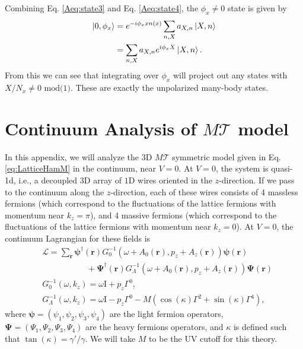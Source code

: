\documentclass[prb,aps,twocolumn,groupaddress,floatfix]{revtex4-1}
\begin{document}
Combining Eq. \ref{Aeq:state3} and Eq. \ref{Aeq:state4}, the $\phi_x \neq 0$ state is given by
\begin{equation}
\begin{split}
\ket{0,\phi_x} &= e^{-i\phi_x x n(x)}\sum_{n,X} a_{X,n} \ket{X,n}\\
& = \sum_{n,X} a_{X,n} e^{i\phi_x X}\ket{X,n}.
\end{split}\label{Aeq:state5}
\end{equation}
From this we can see that integrating over $\phi_x$ will project out any states with $X/N_x \neq 0\text{ mod(1)}$. These are exactly the unpolarized many-body states. 





\section{Continuum Analysis of $M\mathcal{T}$ model} \label{app:MContAnalysis}
In this appendix, we will analyze the $3$D $M\mathcal{T}$ symmetric model given in Eq. \ref{eq:LatticeHamM} in the continuum, near $V = 0$.  At $V = 0$, the system is quasi-1d, i.e., a decoupled $3$D array of $1$D wires oriented in the $z$-direction. If we pass to the continuum along the $z$-direction, each of these wires consists of 4 massless fermions (which correspond to the fluctuations of the lattice fermions with momentum near $k_z = \pi$), and 4 massive fermions (which correspond to the fluctuations of the lattice fermions with momentum near $k_z = 0$). At $V = 0$, the continuum Lagrangian for these fields is 
\begin{equation}
\begin{split}
&\mathcal{L} = \sum_{\bm{r}} \bm{\psi}^\dagger(\bm{r})G^{-1}_0(\omega+A_0(\bm{r}),p_z+A_z(\bm{r}))\bm{\psi}(\bm{r})\\ &\phantom{====} +\bm{\Psi}^\dagger(\bm{r})G^{-1}_\Lambda(\omega+A_0(\bm{r}),p_z+A_z(\bm{r}))\bm{\Psi}(\bm{r}) \\
&G^{-1}_0(\omega,k_z) =  \omega \text{I} + p_z \Gamma^0,\\
&G^{-1}_\Lambda(\omega,k_z) =  \omega \text{I} - p_z \Gamma^0 - M(\cos(\kappa)\Gamma^2 + \sin(\kappa)\Gamma^4),
\end{split}\label{Aeq:ContLag1}
\end{equation}
where $\bm{\psi} = (\psi_1,\psi_2,\psi_3,\psi_4)$ are the light fermion operators, $\bm{\Psi} = (\Psi_1,\Psi_2,\Psi_3,\Psi_4)$ are the heavy fermions operators, and $\kappa$ is defined such that $\tan(\kappa) = \gamma'/\gamma$. We will take $M$ to be the UV cutoff for this theory. 
\end{document}
